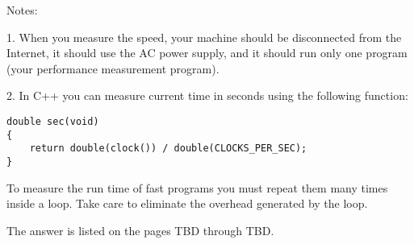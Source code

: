 \documentclass{article}
\begin{document}
		\noindent Notes:
		
		1. When you measure the speed, your machine should be disconnected from the Internet, it should use the AC power supply, and it should run only one program (your performance measurement program).
		
		2. In C++ you can measure current time in seconds using the following function:
		
		\begin{verbatim}
double sec(void)
{
    return double(clock()) / double(CLOCKS_PER_SEC);
}
		\end{verbatim}
		
		To measure the run time of fast programs you must repeat them many times inside a loop. Take care to eliminate the overhead generated by the loop.
		\newline
		
		The answer is listed on the pages TBD through TBD.

\paragraph{}\
\paragraph{}\
\paragraph{}\
\paragraph{}\
\paragraph{}\
\paragraph{}\
\paragraph{}\
\paragraph{}\
\end{document}
